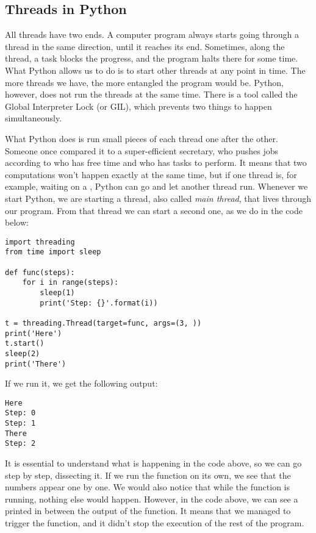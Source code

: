 \subsection{Threads in Python}\label{subsec:multithreading}
All threads have two ends. A computer program always starts going through a thread in the same direction, until it reaches its end. Sometimes, along the thread, a task blocks the progress, and the program halts there for some time. What Python allows us to do is to start other threads at any point in time. The more threads we have, the more entangled the program would be. Python, however, does not run the threads at the same time. There is a tool called the Global Interpreter Lock (or GIL), which prevents two things to happen simultaneously.

What Python does is run small pieces of each thread one after the other. Someone once compared it to a super-efficient secretary, who pushes jobs according to who has free time and who has tasks to perform. It means that two computations won't happen exactly at the same time, but if one thread is, for example, waiting on a , Python can go and let another thread run. Whenever we start Python, we are starting a thread, also called \emph{main thread}, that lives through our program. From that thread we can start a second one, as we do in the code below:

\begin{verbatim}
import threading
from time import sleep

def func(steps):
    for i in range(steps):
        sleep(1)
        print('Step: {}'.format(i))

t = threading.Thread(target=func, args=(3, ))
print('Here')
t.start()
sleep(2)
print('There')
\end{verbatim}

If we run it, we get the following output:

\begin{verbatim}
Here
Step: 0
Step: 1
There
Step: 2
\end{verbatim}

It is essential to understand what is happening in the code above, so we can go step by step, dissecting it. If we run the function  on its own, we see that the numbers appear one by one. We would also notice that while the function is running, nothing else would happen. However, in the code above, we can see a  printed in between the output of the function. It means that we managed to trigger the function, and it didn't stop the execution of the rest of the program.

